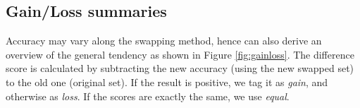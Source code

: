 
\subsection{Gain/Loss summaries}
Accuracy may vary along the swapping method, hence can also derive an overview of the general tendency as shown in Figure \ref{fig:gainloss}. The difference score is calculated by subtracting the new accuracy (using the new swapped set) to the old one (original set). If the result is positive, we tag it as \emph{gain}, and otherwise as \emph{loss}. If the scores are exactly the same, we use \emph{equal}.

